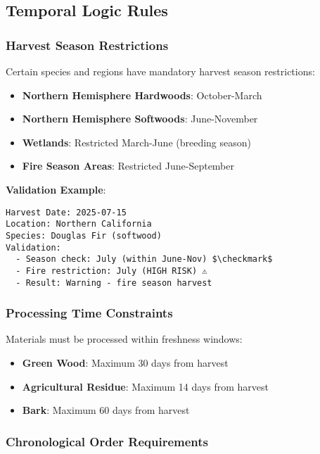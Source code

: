 \subsection{Temporal Logic Rules}
\label{sec:temporal-logic}

\subsubsection{Harvest Season Restrictions}

Certain species and regions have mandatory harvest season restrictions:

\begin{itemize}
    \item \textbf{Northern Hemisphere Hardwoods}: October-March
    \item \textbf{Northern Hemisphere Softwoods}: June-November  
    \item \textbf{Wetlands}: Restricted March-June (breeding season)
    \item \textbf{Fire Season Areas}: Restricted June-September
\end{itemize}

\textbf{Validation Example}:
\begin{verbatim}
Harvest Date: 2025-07-15
Location: Northern California
Species: Douglas Fir (softwood)
Validation:
  - Season check: July (within June-Nov) $\checkmark$
  - Fire restriction: July (HIGH RISK) ⚠
  - Result: Warning - fire season harvest
\end{verbatim}

\subsubsection{Processing Time Constraints}

Materials must be processed within freshness windows:

\begin{itemize}
    \item \textbf{Green Wood}: Maximum 30 days from harvest
    \item \textbf{Agricultural Residue}: Maximum 14 days from harvest
    \item \textbf{Bark}: Maximum 60 days from harvest
\end{itemize}

\subsubsection{Chronological Order Requirements}

